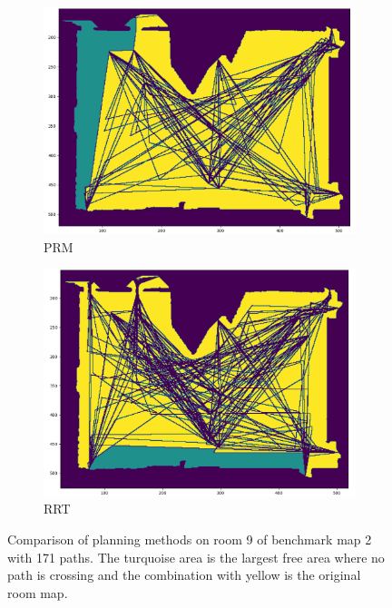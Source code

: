 \begin{figure}[h]
\begin{subfigure}{.35\textwidth}
      \includegraphics[width=\textwidth]{figures/60_results/room9_disturbance_prm.png}
      \caption{PRM}
    \end{subfigure}%
    \begin{subfigure}{.35\textwidth}
      \centering
      \includegraphics[width=\textwidth]{figures/60_results/room9_disturbance_rrt.png}
      \caption{RRT}
    \end{subfigure}
    \caption[Comparison of planning methods on room 9 of benchmark map 2 with 171 paths]{Comparison of planning methods on room 9 of benchmark map 2 with 171 paths. The turquoise area is the largest free area where no path is crossing and the combination with yellow is the original room map.}
    \label{fig:hou_room9_comparison}
\end{figure}

